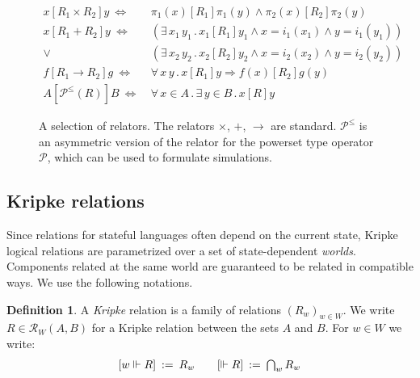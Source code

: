\documentclass[draft,11pt]{report}
\theoremstyle{definition}
\newtheorem{definition}[theorem]{Definition}
\newcommand{\ifr}[1]{\mathrel{[{#1}]}}
\newcommand{\figsize}{}
\begin{document}
\begin{figure} %
  \figsize
  \begin{align*}
    x \ifr{R_1 \times R_2} y \ \Leftrightarrow\  &
      \pi_1(x) \ifr{R_1} \pi_1(y) \wedge
      \pi_2(x) \ifr{R_2} \pi_2(y) \\
    x \ifr{R_1 + R_2} y \ \Leftrightarrow\  &
      (\exists \, x_1 \, y_1 \,.\,
        x_1 \ifr{R_1} y_1 \wedge
        x = i_1(x_1) \wedge
        y = i_1(y_1)) \\ \vee\ &
      (\exists \, x_2 \, y_2 \,.\,
        x_2 \ifr{R_2} y_2 \wedge
        x = i_2(x_2) \wedge
        y = i_2(y_2)) \\
    f \ifr{R_1 \rightarrow R_2} g \ \Leftrightarrow\  &
      \forall \, x \, y \,.\,
        x \ifr{R_1} y \Rightarrow
        f(x) \ifr{R_2} g(y) \\
    A \ifr{\mathcal{P}^\le(R)} B \ \Leftrightarrow\  &
      \forall \, x \in A \,.\,
      \exists \, y \in B \,.\,
      x \ifr{R} y
  \end{align*}
  \caption{A selection of relators.
    The relators $\times$, $+$, $\rightarrow$ are standard.
    $\mathcal{P}^\le$ is an asymmetric version of
    the relator for the powerset type operator $\mathcal{P}$,
    which can be used to formulate simulations.
    }
  \label{fig:relators}
\end{figure}


\subsection{Kripke relations}

Since relations for stateful languages
often depend on the current state,
Kripke logical relations
are parametrized over a set of state-dependent \emph{worlds}.
Components related at the same world
are guaranteed to be related in compatible ways.
We use the following notations.

\begin{definition} \label{def:klr} %
A \emph{Kripke} relation is
a family of relations $(R_w)_{w \in W}$.
We write $R \in \mathcal{R}_W(A, B)$
for a Kripke relation between the sets $A$ and $B$.
For $w \in W$ we write:
\[
\begin{array}{c@{\qquad}c}
    [w \Vdash R] \: := \: R_w &
    [\Vdash R] \: := \: \bigcap_{w} R_w
\end{array}
\]
\end{definition}
\end{document}
